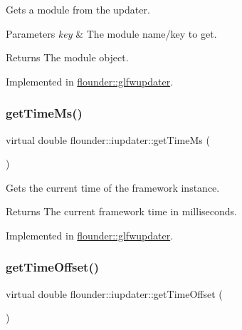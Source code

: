 Gets a module from the updater. 


\begin{DoxyParams}{Parameters}
{\em key} & The module name/key to get. \\
\hline
\end{DoxyParams}
\begin{DoxyReturn}{Returns}
The module object. 
\end{DoxyReturn}


Implemented in \hyperlink{classflounder_1_1glfwupdater_a284945635b93ffc1bd6164ff20565349}{flounder\+::glfwupdater}.

\mbox{\label{classflounder_1_1iupdater_a56548faad88ad85e0cb4bc96af0912d6}} 
\subsubsection{\texorpdfstring{get\+Time\+Ms()}{getTimeMs()}}
{\footnotesize\ttfamily virtual double flounder\+::iupdater\+::get\+Time\+Ms (\begin{DoxyParamCaption}{ }\end{DoxyParamCaption})\hspace{0.3cm}{\ttfamily [pure virtual]}}



Gets the current time of the framework instance. 

\begin{DoxyReturn}{Returns}
The current framework time in milliseconds. 
\end{DoxyReturn}


Implemented in \hyperlink{classflounder_1_1glfwupdater_a1c3b884efb6e785143db556d4db9bdc8}{flounder\+::glfwupdater}.

\mbox{\label{classflounder_1_1iupdater_abd983cbbeed27f28e9be768a2d3b69f2}} 
\subsubsection{\texorpdfstring{get\+Time\+Offset()}{getTimeOffset()}}
{\footnotesize\ttfamily virtual double flounder\+::iupdater\+::get\+Time\+Offset (\begin{DoxyParamCaption}{ }\end{DoxyParamCaption})\hspace{0.3cm}{\ttfamily [pure virtual]}}



